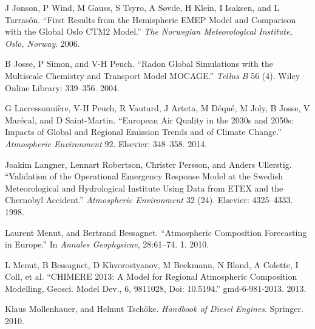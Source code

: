 \documentclass[9pt]{report}
\begin{document}
{\begin{thebibliography}{32}
J Jonson, P Wind, M Gauss, S Tsyro, A S\o{}vde, H Klein, I Isaksen, and L Tarras\'{o}n. \textquotedblleft{}First Results from the Hemispheric EMEP Model and Comparison with the Global Oslo CTM2 Model.\textquotedblright{} \emph{The Norwegian Meteorological Institute, Oslo, Norway}. 2006.\label{jonson2006first}%

B Josse, P Simon, and V-H Peuch. \textquotedblleft{}Radon Global Simulations with the Multiscale Chemistry and Transport Model MOCAGE.\textquotedblright{} \emph{Tellus B} 56 (4). Wiley Online Library: 339–356. 2004.\label{josse2004radon}%

G Lacressonni\`{e}re, V-H Peuch, R Vautard, J Arteta, M D\'{e}qu\'{e}, M Joly, B Josse, V Mar\'{e}cal, and D Saint-Martin. \textquotedblleft{}European Air Quality in the 2030s and 2050s: Impacts of Global and Regional Emission Trends and of Climate Change.\textquotedblright{} \emph{Atmospheric Environment} 92. Elsevier: 348–358. 2014.\label{lacressonniere2014european}%

Joakim Langner, Lennart Robertson, Christer Persson, and Anders Ullerstig. \textquotedblleft{}Validation of the Operational Emergency Response Model at the Swedish Meteorological and Hydrological Institute Using Data from ETEX and the Chernobyl Accident.\textquotedblright{} \emph{Atmospheric Environment} 32 (24). Elsevier: 4325–4333. 1998.\label{langner1998validation}%

Laurent Menut, and Bertrand Bessagnet. \textquotedblleft{}Atmospheric Composition Forecasting in Europe.\textquotedblright{} In \emph{Annales Geophysicae}, 28:61–74. 1. 2010.\label{menut2010atmospheric}%

L Menut, B Bessagnet, D Khvorostyanov, M Beekmann, N Blond, A Colette, I Coll, et al. \textquotedblleft{}CHIMERE 2013: A Model for Regional Atmospheric Composition Modelling, Geosci. Model Dev., 6, 981\textendash{}1028, Doi: 10.5194.\textquotedblright{} gmd-6-981-2013. 2013.\label{menut2013chimere}%

Klaus Mollenhauer, and Helmut Tschöke. \emph{Handbook of Diesel Engines}. Springer. 2010.\label{mollenhauer2010handbook}%


\end{thebibliography}}
\end{document}
